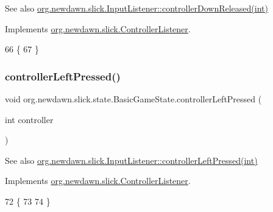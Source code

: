 \begin{DoxySeeAlso}{See also}
\mbox{\hyperlink{interfaceorg_1_1newdawn_1_1slick_1_1_controller_listener_a7d0ca99c8cd5b0d332bece1d17befee7}{org.\+newdawn.\+slick.\+Input\+Listener\+::controller\+Down\+Released(int)}} 
\end{DoxySeeAlso}


Implements \mbox{\hyperlink{interfaceorg_1_1newdawn_1_1slick_1_1_controller_listener_a7d0ca99c8cd5b0d332bece1d17befee7}{org.\+newdawn.\+slick.\+Controller\+Listener}}.


\begin{DoxyCode}
66                                                        \{
67     \}
\end{DoxyCode}
\mbox{\label{classorg_1_1newdawn_1_1slick_1_1state_1_1_basic_game_state_ae506f3ea09df308d00e6253ca85cffc4}} 
\subsubsection{\texorpdfstring{controller\+Left\+Pressed()}{controllerLeftPressed()}}
{\footnotesize\ttfamily void org.\+newdawn.\+slick.\+state.\+Basic\+Game\+State.\+controller\+Left\+Pressed (\begin{DoxyParamCaption}\item[{int}]{controller }\end{DoxyParamCaption})\hspace{0.3cm}{\ttfamily [inline]}}

\begin{DoxySeeAlso}{See also}
\mbox{\hyperlink{interfaceorg_1_1newdawn_1_1slick_1_1_controller_listener_abfb38c5d8e44b7613a49cbfaf19d5585}{org.\+newdawn.\+slick.\+Input\+Listener\+::controller\+Left\+Pressed(int)}} 
\end{DoxySeeAlso}


Implements \mbox{\hyperlink{interfaceorg_1_1newdawn_1_1slick_1_1_controller_listener_abfb38c5d8e44b7613a49cbfaf19d5585}{org.\+newdawn.\+slick.\+Controller\+Listener}}.


\begin{DoxyCode}
72                                                       \{
73         
74     \}
\end{DoxyCode}
\mbox{\label{classorg_1_1newdawn_1_1slick_1_1state_1_1_basic_game_state_a71bbea4a21962a1a403e51f0ccd9a87c}} 
